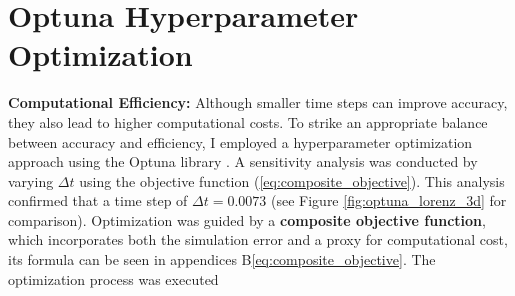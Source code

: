 \section{Optuna \cite{akiba2019optuna} Hyperparameter Optimization}


\textbf{Computational Efficiency:} Although smaller time steps can improve accuracy, they also lead to higher computational costs. To strike an appropriate balance between accuracy and efficiency, I employed a hyperparameter optimization approach using the Optuna library \cite{akiba2019optuna} . A sensitivity analysis was conducted by varying \(\Delta t\) using the objective function (\ref{eq:composite_objective}). This analysis confirmed that a time step of \(\Delta t = 0.0073\) (see Figure \ref{fig:optuna_lorenz_3d} for comparison).
\noindent
Optimization was guided by a \textbf{composite objective function}, which incorporates both the simulation error and a proxy for computational cost, its formula can be seen in appendices B\ref{eq:composite_objective}.
The optimization process was executed